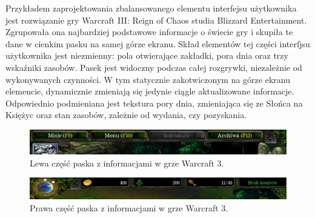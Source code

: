 Przykładem zaprojektowania zbalansowanego elementu interfejsu użytkownika jest rozwiązanie gry Warcraft III: Reign of Chaos studia Blizzard Entertainment.
Zgrupowała ona najbardziej podstawowe informacje o świecie gry i skupiła te dane w cienkim pasku na samej górze ekranu. 
Skład elementów tej części interfjsu użytkownika jest niezmienny: pola otwierające zakładki, pora dnia oraz trzy wskaźniki zasobów. Pasek jest widoczny
podczas całej rozgrywki, niezależnie od wykonywanych czynności. W tym statycznie zakotwiczonym na górze ekranu elemencie, dynamicznie
zmieniają się jedynie ciągle aktualizowane informacje. Odpowiednio podmieniana jest tekstura pory dnia, zmieniająca się ze Słońca
na Księżyc oraz stan zasobów, zależnie od wydania, czy pozyskania.

\begin{figure}[htbp]
    \centering
    \includegraphics[width=1.0\textwidth]{images/ui/warcraft3_gorny_pasek_lewy.png}
    \caption{Lewa część paska z informacjami w grze Warcraft 3.}\label{fig:Warcraft3}
\end{figure}

\begin{figure}[htbp]
    \centering
    \includegraphics[width=1.0\textwidth]{images/ui/warcraft3_gorny_pasek_prawy.png}
    \caption{Prawa część paska z informacjami w grze Warcraft 3.}\label{fig:Warcraft3}
\end{figure}